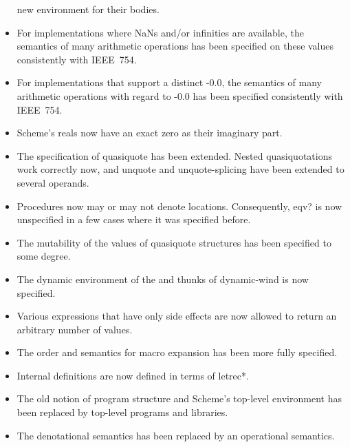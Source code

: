 \begin{itemize}
  new environment for their bodies.
\item For implementations where NaNs and/or infinities are available,
  the semantics of many arithmetic operations has been specified on
  these values consistently with IEEE~754.
\item For implementations that support a distinct -0.0, the semantics
  of many arithmetic operations with regard to -0.0 has been specified
  consistently with IEEE~754.
\item Scheme's reals now have an exact zero as their imaginary part.
\item The specification of {\cf quasiquote} has been extended.  Nested
  quasiquotations work correctly now, and {\cf unquote} and {\cf
    unquote-splicing} have been extended to several operands.
\item Procedures now may or may not denote
  locations.  Consequently, {\cf eqv?} is now unspecified in a few
  cases where it was specified before.
\item The mutability of the values of {\cf quasiquote} structures has
  been specified to some degree.
\item The dynamic environment of the  and 
  thunks of {\cf dynamic-wind} is now specified.
\item Various expressions that have only side effects are now allowed
  to return an arbitrary number of values.
\item The order and semantics for macro expansion has been more fully
  specified.
\item Internal definitions are now defined in terms of {\cf letrec*}.
\item The old notion of program structure and Scheme's top-level
  environment has been replaced by top-level programs and libraries.
\item The denotational semantics has been replaced by an operational
  semantics.
\end{itemize}

